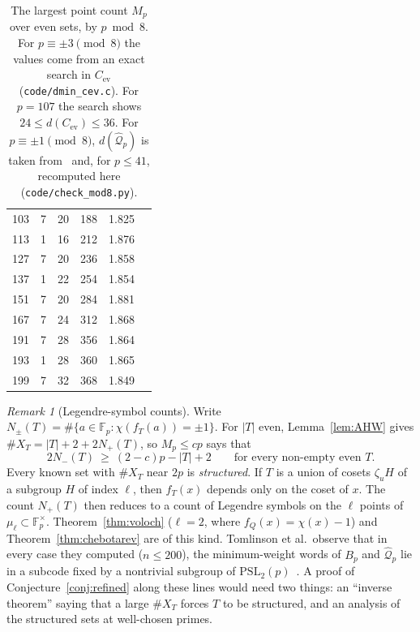 \documentclass[12pt,letterpaper]{article}
\theoremstyle{definition}
\theoremstyle{remark}
\newtheorem{remark}[theorem]{Remark}
\numberwithin{equation}{section}
\newcommand{\Fp}{\mathbb{F}_p}
\newcommand{\Cev}{C_{\mathrm{ev}}}
\newcommand{\X}{\#X}
\begin{document}
\begin{table}[p]
\begin{tabular}{@{}rcrrcl@{}}
103 & 7 & 20 & 188 & 1.825 & \cite{TTAAJ17}\\
113 & 1 & 16 & 212 & 1.876 & \cite{TTAAJ17}\\
127 & 7 & 20 & 236 & 1.858 & \cite{TTAAJ17}\\
137 & 1 & 22 & 254 & 1.854 & \cite{TTAAJ17}\\
151 & 7 & 20 & 284 & 1.881 & \cite{TTAAJ17}\\
167 & 7 & 24 & 312 & 1.868 & \cite{TTAAJ17}\\
191 & 7 & 28 & 356 & 1.864 & \cite{TTAAJ17}\\
193 & 1 & 28 & 360 & 1.865 & \cite{TTAAJ17}\\
199 & 7 & 32 & 368 & 1.849 & \cite{TTAAJ17}\\
\bottomrule
\end{tabular}
\caption{The largest point count $M_p$ over even sets, by $p\bmod8$. For
$p\equiv\pm3\pmod8$ the values come from an exact search in $\Cev$
(\texttt{code/dmin\_cev.c}). For $p=107$ the search shows $24\le d(\Cev)\le36$. For
$p\equiv\pm1\pmod8$, $d(\widehat{\mathcal Q}_p)$ is taken from~\cite[Table~9.4]{TTAAJ17}
and, for $p\le41$, recomputed here (\texttt{code/check\_mod8.py}).}
\label{tab:mod8}
\end{table}

\begin{remark}[Legendre-symbol counts]\label{rem:legendre}
Write $N_\pm(T)=\#\{a\in\Fp:\chi(f_T(a))=\pm1\}$. For $|T|$ even,
Lemma~\ref{lem:AHW} gives $\X_T=|T|+2+2N_+(T)$, so $M_p\le cp$ says that
\[
2N_-(T)\ \ge\ (2-c)p-|T|+2\qquad\text{for every non-empty even }T.
\]
Every known set with $\X_T$ near $2p$ is \emph{structured}. If $T$ is a union of
cosets $\zeta_uH$ of a subgroup $H$ of index $\ell$, then $f_T(x)$ depends only on
the coset of $x$. The count $N_+(T)$ then reduces to a count of Legendre symbols on
the $\ell$ points of $\mu_\ell\subset\Fp^\times$. Theorem~\ref{thm:voloch}
($\ell=2$, where $f_Q(x)=\chi(x)-1$) and Theorem~\ref{thm:chebotarev} are of this
kind. Tomlinson et al.\ observe that in every case they computed ($n\le200$), the
minimum-weight words of $B_p$ and $\widehat{\mathcal Q}_p$ lie in a subcode fixed
by a nontrivial subgroup of $\mathrm{PSL}_2(p)$~\cite[\S9.7]{TTAAJ17}. A proof of
Conjecture~\ref{conj:refined} along these lines would need two things: an
``inverse theorem'' saying that a large $\X_T$ forces $T$ to be structured, and an
analysis of the structured sets at well-chosen primes.
\end{remark}

\end{document}
